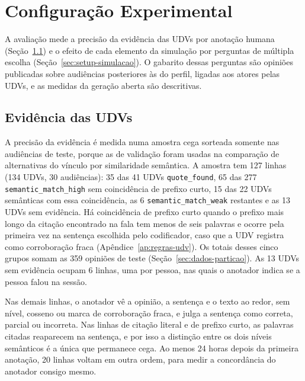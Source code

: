 \section{Configura\c{c}\~ao Experimental}
\label{sec:setup}

A avaliação mede a precisão da evidência das UDVs por anotação humana (Seção~\ref{sec:setup-udv}) e
o efeito de cada elemento da simulação por perguntas de múltipla escolha
(Seção~\ref{sec:setup-simulacao}). O gabarito dessas perguntas são opiniões publicadas sobre
audiências posteriores às do perfil, ligadas aos atores pelas UDVs, e as medidas da geração aberta são
descritivas.

\subsection{Evidência das UDVs}
\label{sec:setup-udv}

A precisão da evidência é medida numa amostra cega sorteada somente nas audiências de teste, porque
as de validação foram usadas na comparação de alternativas do vínculo por similaridade semântica. A
amostra tem 127 linhas (134 UDVs, 30 audiências): 35 das 41 UDVs \texttt{quote\_found}, 65 das 277
\texttt{semantic\_match\_high} sem coincidência de prefixo curto, 15 das 22 UDVs semânticas com essa
coincidência, as 6 \texttt{semantic\_match\_weak} restantes e as 13 UDVs sem evidência. Há
coincidência de prefixo curto quando o prefixo mais longo da citação encontrado na fala tem menos de
seis palavras e ocorre pela primeira vez na sentença escolhida pelo codificador, caso que a UDV
registra como corroboração fraca (Apêndice~\ref{ap:regras-udv}). Os totais desses cinco grupos somam as 359 opiniões de teste
(Seção~\ref{sec:dados-particao}). As 13 UDVs sem evidência ocupam 6 linhas, uma por pessoa, nas quais
o anotador indica se a pessoa falou na sessão.

Nas demais linhas, o anotador vê a opinião, a sentença e o texto ao redor, sem nível, cosseno ou
marca de corroboração fraca, e julga a sentença como correta, parcial ou incorreta. Nas linhas de
citação literal e de prefixo curto, as palavras citadas reaparecem na sentença, e por isso a
distinção entre os dois níveis semânticos é a única que permanece cega. Ao menos 24 horas depois da
primeira anotação, 20 linhas voltam em outra ordem, para medir a concordância do anotador consigo
mesmo.

